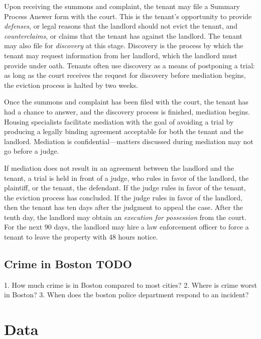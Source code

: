 \documentclass[12pt]{article}
\begin{document}
        Upon receiving the summons and complaint, the tenant may file a Summary Process Answer form with the court. This is the tenant's opportunity to provide \textit{defenses}, or legal reasons that the landlord should not evict the tenant, and \textit{counterclaims}, or claims that the tenant has against the landlord. The tenant may also file for \textit{discovery} at this stage. Discovery is the process by which the tenant may request information from her landlord, which the landlord must provide under oath. Tenants often use discovery as a means of postponing a trial: as long as the court receives the request for discovery before mediation begins, the eviction process is halted by two weeks.

        Once the summons and complaint has been filed with the court, the tenant has had a chance to answer, and the discovery process is finished, mediation begins. Housing specialists facilitate mediation with the goal of avoiding a trial by producing a legally binding agreement acceptable for both the tenant and the landlord. Mediation is confidential—matters discussed during mediation may not go before a judge. 

        If mediation does not result in an agreement between the landlord and the tenant, a trial is held in front of a judge, who rules in favor of the landlord, the plaintiff, or the tenant, the defendant. If the judge rules in favor of the tenant, the eviction process has concluded. If the judge rules in favor of the landlord, then the tenant has ten days after the judgment to appeal the case. After the tenth day, the landlord may obtain an \textit{execution for possession} from the court. For the next 90 days, the landlord may hire a law enforcement officer to force a tenant to leave the property with 48 hours notice. 

        
        
    \subsection{Crime in Boston TODO}

    1. How much crime is in Boston compared to most cities?
    2. Where is crime worst in Boston?
    3. When does the boston police department respond to an incident?

\section{Data} \label{sec:data}
\end{document}
